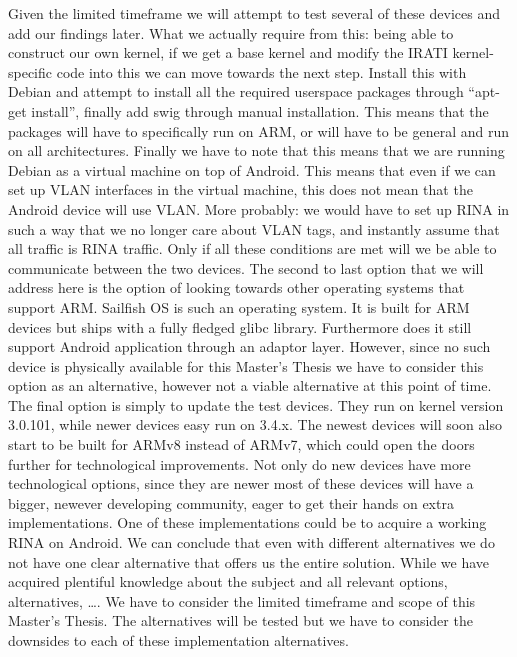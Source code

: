 Given the limited timeframe we will attempt to test several of these devices and add our findings later. What we actually require from this: being able to construct our own kernel, if we get a base kernel and modify the IRATI kernel-specific code into this we can move towards the next step. Install this with Debian and attempt to install all the required userspace packages through ``apt-get install'', finally add swig through manual installation. This means that the packages will have to specifically run on ARM, or will have to be general and run on all architectures. Finally we have to note that this means that we are running Debian as a virtual machine on top of Android. This means that even if we can set up VLAN interfaces in the virtual machine, this does not mean that the Android device will use VLAN. More probably: we would have to set up RINA in such a way that we no longer care about VLAN tags, and instantly assume that all traffic is RINA traffic. Only if all these conditions are met will we be able to communicate between the two devices.
\npar
The second to last option that we will address here is the option of looking towards other operating systems that support ARM. Sailfish OS is such an operating system. It is built for ARM devices but ships with a fully fledged glibc library. Furthermore does it still support Android application through an adaptor layer. However, since no such device is physically available for this Master's Thesis we have to consider this option as an alternative, however not a viable alternative at this point of time.
\npar
The final option is simply to update the test devices. They run on kernel version 3.0.101, while newer devices easy run on 3.4.x. The newest devices will soon also start to be built for ARMv8 instead of ARMv7, which could open the doors further for technological improvements. Not only do new devices have more technological options, since they are newer most of these devices will have a bigger, newever developing community, eager to get their hands on extra implementations. One of these implementations could be to acquire a working RINA on Android.
\npar
We can conclude that even with different alternatives we do not have one clear alternative that offers us the entire solution. While we have acquired plentiful knowledge about the subject and all relevant options, alternatives, \ldots. We have to consider the limited timeframe and scope of this Master's Thesis. The alternatives will be tested but we have to consider the downsides to each of these implementation alternatives.



